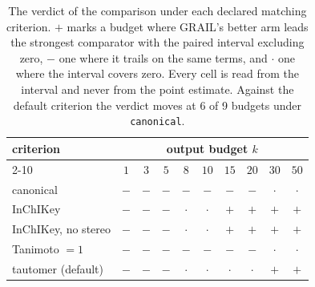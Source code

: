 \begin{table}[h]
\centering\small
\begin{tabular}{lccccccccc}
\toprule
criterion & \multicolumn{9}{c}{output budget $k$} \\
\cmidrule(lr){2-10}
 & $1$ & $3$ & $5$ & $8$ & $10$ & $15$ & $20$ & $30$ & $50$ \\
\midrule
canonical & $-$ & $-$ & $-$ & $-$ & $-$ & $-$ & $-$ & $\cdot$ & $\cdot$ \\
InChIKey & $-$ & $-$ & $-$ & $\cdot$ & $\cdot$ & $+$ & $+$ & $+$ & $+$ \\
InChIKey, no stereo & $-$ & $-$ & $-$ & $\cdot$ & $\cdot$ & $+$ & $+$ & $+$ & $+$ \\
Tanimoto $=1$ & $-$ & $-$ & $-$ & $-$ & $-$ & $-$ & $-$ & $\cdot$ & $\cdot$ \\
tautomer (default) & $-$ & $-$ & $-$ & $\cdot$ & $\cdot$ & $\cdot$ & $\cdot$ & $+$ & $+$ \\
\bottomrule
\end{tabular}
\caption{The verdict of the comparison under each declared matching criterion. $+$ marks a budget where GRAIL's better arm leads the strongest comparator with the paired interval excluding zero, $-$ one where it trails on the same terms, and $\cdot$ one where the interval covers zero. Every cell is read from the interval and never from the point estimate. Against the default criterion the verdict moves at 6 of 9 budgets under \texttt{canonical}.}
\label{tab:si-criterion}
\end{table}
